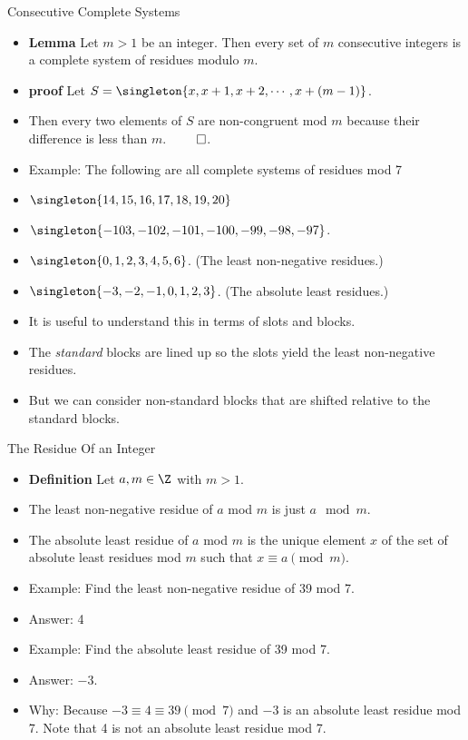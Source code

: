 \documentclass{beamer}
\begin{document}

\begin{frame}{Consecutive Complete Systems}

\begin{itemize}
  \item  \textbf{Lemma} Let $m>1$ be an integer. Then every set of $m$ consecutive integers is
  a complete system of residues modulo $m$.
  \item \textbf{proof} Let $S=\singleton{x, x+1, x+2, \cdots ,x+(m-1)}$.
  \item Then every two elements of $S$ are non-congruent mod $m$ because their difference is less than $m$. $\qed$.
  \item Example: The following are all complete systems of residues mod 7
  \item $\singleton{14,15,16,17,18,19, 20}$
  \item $\singleton{-103, -102, -101, -100, -99, -98, -97}$.
  \item $\singleton{0,1,2,3,4,5, 6}$. (The least non-negative residues.)
  \item $\singleton{-3,-2,-1,0,1,2,3}$. (The absolute least residues.)
  \item It is useful to understand this in terms of slots and blocks.
  \item The \emph{standard} blocks are lined up so the slots yield the least non-negative residues.
  \item But we can consider non-standard blocks that are shifted relative to the standard blocks.
\end{itemize}

\end{frame}


\begin{frame}{The Residue Of an Integer}

\begin{itemize}
  \item  \textbf{Definition} Let $a, m \in\Z$ with $m>1$.
  \item The least non-negative residue of $a$ mod $m$ is just $a\mod m$.
  \item The absolute least residue of $a$ mod $m$ is the unique element $x$ of
  the set of absolute least residues mod $m$ such that $x\equiv a \pmod m$.
  \item Example: Find the least non-negative residue of 39 mod 7.
  \item Answer: 4
  \item Example: Find the absolute least residue of 39 mod 7.
  \item Answer: $-3$.
  \item Why: Because $-3\equiv 4 \equiv 39 \pmod 7$ and $-3$ is an absolute least residue mod 7.
  Note that 4 is not an absolute least residue mod 7.
\end{itemize}

\end{frame}
\end{document}
